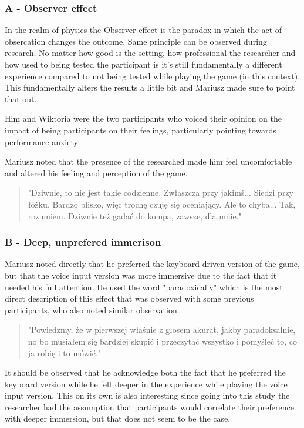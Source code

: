 \subsubsection{A - Observer effect}

In the realm of physics the Observer effect is the paradox in which the act of obsercation changes the outcome.
Same principle can be observed during research. No matter how good is the setting, how professional the researcher and how used to being tested the participant is it's still fundamentally a different experience compared to not being tested while playing the game (in this context). This fundamentally alters the results a little bit and Mariusz made sure to point that out.

Him and Wiktoria were the two participants who voiced their opinion on the impact of being participants on their feelings, particularly pointing towards performance anxiety 

Mariusz noted that the presence of the researched made him feel uncomfortable and altered his feeling and perception of the game. 

\begin{quote}
    "Dziwnie, to nie jest takie codzienne.
    Zwłaszcza przy jakimś...
    Siedzi przy łóżku.
    Bardzo blisko, więc trochę czuję się oceniający.
    Ale to chyba... Tak, rozumiem.
    Dziwnie też gadać do kompa, zawsze, dla mnie."
\end{quote}


\subsubsection{B - Deep, unprefered immerison}

Mariusz noted directly that he preferred the keyboard driven version of the game, but that the voice input version was more immersive due to the fact that it needed his full attention. He used the word "paradoxically" which is the most direct description of this effect that was observed with some previous participants, who also noted similar observation. 

\begin{quote}
    "Powiedzmy, że w pierwszej właśnie z głosem akurat, jakby paradoksalnie, no bo musiałem się bardziej skupić i przeczytać wszystko i pomyśleć to, co ja robię i to mówić."
\end{quote}

It should be observed that he acknowledge both the fact that he preferred the keyboard version while he felt deeper in the experience while playing the voice input version. This on its own is also interesting since going into this study the researcher had the assumption that participants would correlate their preference with deeper immersion, but that does not seem to be the case.


